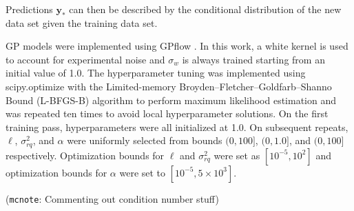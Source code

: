 \documentclass[journal=jacsat,manuscript=article]{achemso}
\newcommand{\xvec}{\ensuremath{\mathbf{x}}}
\newcommand{\mcnote}[1]{{\color{Plum} (\texttt{mcnote}: #1)}}
\begin{document}
\noindent Predictions $\mathbf{y}_*$ can then be described by the conditional distribution of the new data set given the training data set.


GP models were implemented using GPflow \cite{Matthews2017GPflow:TensorFlow}. In this work, a white kernel is used to account for experimental noise and $\sigma_w$ is always trained starting from an initial value of 1.0. The hyperparameter tuning was implemented using scipy.optimize \cite{Virtanen2020SciPyPython} with the Limited-memory Broyden–Fletcher–Goldfarb–Shanno Bound (L-BFGS-B) algorithm to perform maximum likelihood estimation and was repeated ten times to avoid local hyperparameter solutions. On the first training pass, hyperparameters were all initialized at 1.0. On subsequent repeats, $\ell$, $\sigma^2_{rq}$, and $\alpha$ were uniformly selected from bounds $(0, 100]$, $(0, 1.0]$, and $(0, 100]$  respectively. Optimization bounds for $\ell$ and $\sigma^2_{rq}$ were set as $[10^{-5}, 10^2]$ and optimization bounds for $\alpha$ were set to $[10^{-5}, 5\times 10^3]$.

\mcnote{Commenting out condition number stuff}
\end{document}
